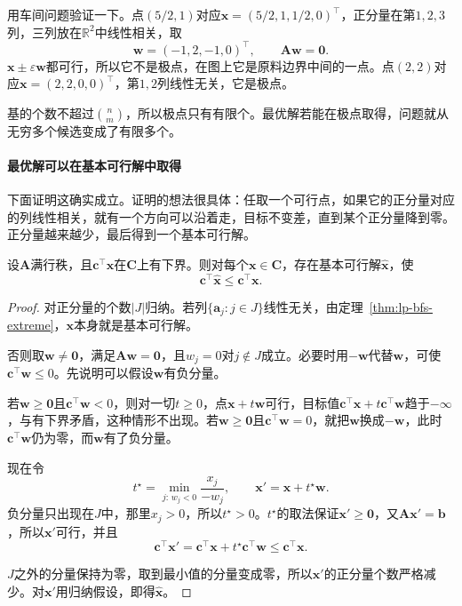 用车间问题验证一下。点$(5/2,1)$对应$\bm{x}=(5/2,1,1/2,0)^\top$，正分量在第$1,2,3$列，三列放在$\mathbb{R}^2$中线性相关，取
\[
 \bm{w}=(-1,2,-1,0)^\top,\qquad\bm{A}\bm{w}=\bm{0}.
\]
$\bm{x}\pm\varepsilon\bm{w}$都可行，所以它不是极点，在图上它是原料边界中间的一点。点$(2,2)$对应$\bm{x}=(2,2,0,0)^\top$，第$1,2$列线性无关，它是极点。

基的个数不超过$\binom{n}{m}$，所以极点只有有限个。最优解若能在极点取得，问题就从无穷多个候选变成了有限多个。

\paragraph{最优解可以在基本可行解中取得}
下面证明这确实成立。证明的想法很具体：任取一个可行点，如果它的正分量对应的列线性相关，就有一个方向可以沿着走，目标不变差，直到某个正分量降到零。正分量越来越少，最后得到一个基本可行解。

\begin{lemma}[推向基本可行解]
 \label{lem:lp-push}
 设$\bm{A}$满行秩，且$\bm{c}^\top\bm{x}$在$\bm{C}$上有下界。则对每个$\bm{x}\in\bm{C}$，存在基本可行解$\widehat{\bm{x}}$，使
 \begin{equation}
  \bm{c}^\top\widehat{\bm{x}}\leq\bm{c}^\top\bm{x}.
  \label{eq:lp-push}
 \end{equation}
\end{lemma}

\begin{proof}
 对正分量的个数$\lvert J\rvert$归纳。若列$\{\bm{a}_j:j\in J\}$线性无关，由定理~\ref{thm:lp-bfs-extreme}，$\bm{x}$本身就是基本可行解。

 否则取$\bm{w}\neq\bm{0}$，满足$\bm{A}\bm{w}=\bm{0}$，且$w_j=0$对$j\notin J$成立。必要时用$-\bm{w}$代替$\bm{w}$，可使$\bm{c}^\top\bm{w}\leq0$。先说明可以假设$\bm{w}$有负分量。

 若$\bm{w}\geq\bm{0}$且$\bm{c}^\top\bm{w}<0$，则对一切$t\geq0$，点$\bm{x}+t\bm{w}$可行，目标值$\bm{c}^\top\bm{x}+t\bm{c}^\top\bm{w}$趋于$-\infty$，与有下界矛盾，这种情形不出现。若$\bm{w}\geq\bm{0}$且$\bm{c}^\top\bm{w}=0$，就把$\bm{w}$换成$-\bm{w}$，此时$\bm{c}^\top\bm{w}$仍为零，而$\bm{w}$有了负分量。

 现在令
 \[
  t^\star=\min_{j:\,w_j<0}\frac{x_j}{-w_j},\qquad\bm{x}'=\bm{x}+t^\star\bm{w}.
 \]
 负分量只出现在$J$中，那里$x_j>0$，所以$t^\star>0$。$t^\star$的取法保证$\bm{x}'\geq\bm{0}$，又$\bm{A}\bm{x}'=\bm{b}$，所以$\bm{x}'$可行，并且
 \[
  \bm{c}^\top\bm{x}'=\bm{c}^\top\bm{x}+t^\star\bm{c}^\top\bm{w}\leq\bm{c}^\top\bm{x}.
 \]

 $J$之外的分量保持为零，取到最小值的分量变成零，所以$\bm{x}'$的正分量个数严格减少。对$\bm{x}'$用归纳假设，即得$\widehat{\bm{x}}$。
\end{proof}

